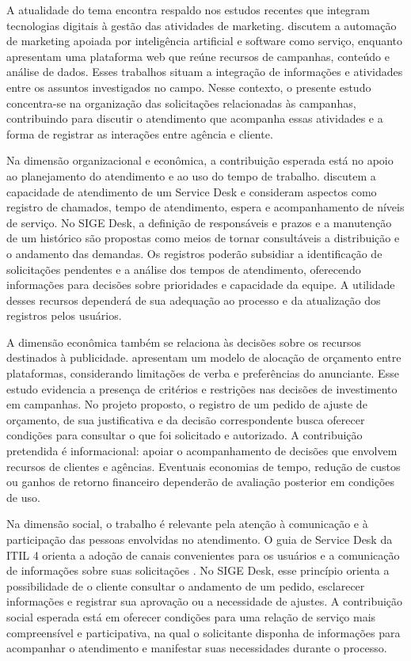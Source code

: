 A atualidade do tema encontra respaldo nos estudos recentes que integram tecnologias digitais à gestão das atividades de marketing.  discutem a automação de marketing apoiada por inteligência artificial e software como serviço, enquanto  apresentam uma plataforma web que reúne recursos de campanhas, conteúdo e análise de dados. Esses trabalhos situam a integração de informações e atividades entre os assuntos investigados no campo. Nesse contexto, o presente estudo concentra-se na organização das solicitações relacionadas às campanhas, contribuindo para discutir o atendimento que acompanha essas atividades e a forma de registrar as interações entre agência e cliente.

Na dimensão organizacional e econômica, a contribuição esperada está no apoio ao planejamento do atendimento e ao uso do tempo de trabalho.  discutem a capacidade de atendimento de um Service Desk e consideram aspectos como registro de chamados, tempo de atendimento, espera e acompanhamento de níveis de serviço. No SIGE Desk, a definição de responsáveis e prazos e a manutenção de um histórico são propostas como meios de tornar consultáveis a distribuição e o andamento das demandas. Os registros poderão subsidiar a identificação de solicitações pendentes e a análise dos tempos de atendimento, oferecendo informações para decisões sobre prioridades e capacidade da equipe. A utilidade desses recursos dependerá de sua adequação ao processo e da atualização dos registros pelos usuários.

A dimensão econômica também se relaciona às decisões sobre os recursos destinados à publicidade.  apresentam um modelo de alocação de orçamento entre plataformas, considerando limitações de verba e preferências do anunciante. Esse estudo evidencia a presença de critérios e restrições nas decisões de investimento em campanhas. No projeto proposto, o registro de um pedido de ajuste de orçamento, de sua justificativa e da decisão correspondente busca oferecer condições para consultar o que foi solicitado e autorizado. A contribuição pretendida é informacional: apoiar o acompanhamento de decisões que envolvem recursos de clientes e agências. Eventuais economias de tempo, redução de custos ou ganhos de retorno financeiro dependerão de avaliação posterior em condições de uso.

Na dimensão social, o trabalho é relevante pela atenção à comunicação e à participação das pessoas envolvidas no atendimento. O guia de Service Desk da ITIL 4 orienta a adoção de canais convenientes para os usuários e a comunicação de informações sobre suas solicitações \cite{servicedesk2023}. No SIGE Desk, esse princípio orienta a possibilidade de o cliente consultar o andamento de um pedido, esclarecer informações e registrar sua aprovação ou a necessidade de ajustes. A contribuição social esperada está em oferecer condições para uma relação de serviço mais compreensível e participativa, na qual o solicitante disponha de informações para acompanhar o atendimento e manifestar suas necessidades durante o processo.

